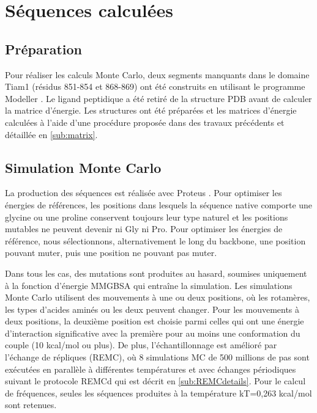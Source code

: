 \clearpage


\section{Séquences calculées}

\subsection{Préparation}
Pour réaliser les calculs Monte Carlo, deux segments manquants dans le domaine Tiam1 (résidus 851-854 et 868-869) ont été construits en utilisant le programme Modeller \cite{Eswar06}. Le ligand peptidique a été retiré de la structure PDB avant de calculer la matrice d'énergie. Les structures ont été préparées et les matrices d'énergie calculées à l'aide d'une procédure proposée dans des travaux précédents \cite{Schmidt08b, Schmidt09} et détaillée en \ref{sub:matrix}. 
 

\subsection{Simulation Monte Carlo}    
La production des séquences est réalisée avec Proteus \cite{Simonson13b}. Pour optimiser les énergies de références, les positions dans lesquels la séquence native comporte une glycine ou une proline conservent toujours leur type naturel et les positions mutables ne peuvent devenir ni Gly ni Pro. Pour optimiser les énergies de référence, nous sélectionnons, alternativement le long du backbone, une position pouvant muter, puis une position ne pouvant pas muter.

Dans tous les cas, des mutations sont produites au hasard, soumises uniquement à la fonction d'énergie MMGBSA qui entraîne la simulation. Les simulations Monte Carlo utilisent des mouvements à une ou deux positions, où les rotamères, les types d'acides aminés ou les deux peuvent changer. Pour les mouvements à deux positions, la deuxième position est choisie parmi celles qui ont une énergie d'interaction significative avec la première pour au moins une conformation du couple (10 kcal/mol ou plus). De plus, l'échantillonnage est amélioré par l'échange de répliques (REMC), où $8$ simulations MC de 500 millions de pas sont exécutées en parallèle à différentes températures et avec échanges périodiques suivant le protocole REMCd qui est décrit en \ref{sub:REMCdetails}. Pour le calcul de fréquences, seules les séquences produites à la température kT=0,263 kcal/mol sont retenues. 


